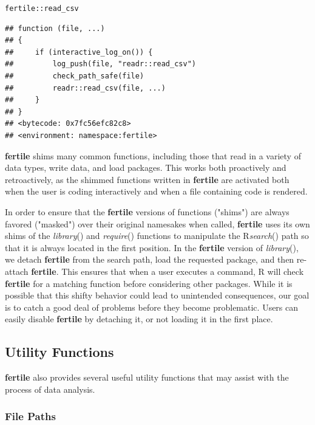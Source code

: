 \documentclass[APA,LATO1COL]{WileyNJD-v2}\usepackage[]{graphicx}\usepackage[]{color}
\makeatletter
\newcommand{\hlopt}[1]{\textcolor[rgb]{0,0,0}{#1}}%
\newcommand{\hlstd}[1]{\textcolor[rgb]{0.345,0.345,0.345}{#1}}%
\newenvironment{kframe}{%
 \def\at@end@of@kframe{}%
 \ifinner\ifhmode%
  \def\at@end@of@kframe{\end{minipage}}%
  \begin{minipage}{\columnwidth}%
 \fi\fi%
 \def\FrameCommand##1{\hskip\@totalleftmargin \hskip-\fboxsep
 \colorbox{shadecolor}{##1}\hskip-\fboxsep
     \hskip-\linewidth \hskip-\@totalleftmargin \hskip\columnwidth}%
 \MakeFramed {\advance\hsize-\width
   \@totalleftmargin\z@ \linewidth\hsize
   \@setminipage}}%
 {\par\unskip\endMakeFramed%
 \at@end@of@kframe}
\newenvironment{knitrout}{}{} %
\newcommand{\R}{\textsf{R}\xspace}
\newcommand{\pkg}[1]{\textbf{#1}}
\newcommand{\func}[1]{\textit{#1}()}
\makeatother
\begin{document}
\begin{knitrout}
\color{fgcolor}\begin{kframe}
\begin{alltt}
\hlstd{fertile}\hlopt{::}\hlstd{read_csv}
\end{alltt}
\begin{verbatim}
## function (file, ...) 
## {
##     if (interactive_log_on()) {
##         log_push(file, "readr::read_csv")
##         check_path_safe(file)
##         readr::read_csv(file, ...)
##     }
## }
## <bytecode: 0x7fc56efc82c8>
## <environment: namespace:fertile>
\end{verbatim}
\end{kframe}
\end{knitrout}

\pkg{fertile} shims many common functions, including those that read in a variety of data types, write data, and load packages. This works both proactively and retroactively, as the shimmed functions written in \pkg{fertile} are activated both when the user is coding interactively and when a file containing code is rendered.

In order to ensure that the \pkg{fertile} versions of functions ("shims") are always favored ("masked") over their original namesakes when called, \pkg{fertile} uses its own shims of the \func{library} and \func{require} functions to  manipulate the \R \func{search} path so that it is always located in the first position. In the \pkg{fertile} version of \func{library}, we detach \pkg{fertile} from the search path, load the requested package, and then re-attach \pkg{fertile}. This ensures that when a user executes a command, \R will check \pkg{fertile} for a matching function before considering other packages. While it is possible that this shifty behavior could lead to unintended consequences, our goal is to catch a good deal of problems before they become problematic. Users can easily disable \pkg{fertile} by detaching it, or not loading it in the first place. 


\subsection{Utility Functions}

\pkg{fertile} also provides several useful utility functions that may assist with the process of data analysis. 

\subsubsection{File Paths}
\end{document}
